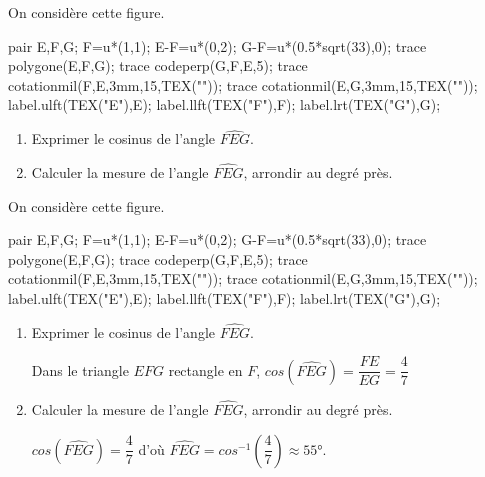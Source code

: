 \begin{exercice*}
    On considère cette figure.
    \begin{center}
        \begin{Geometrie}
            pair E,F,G;
            F=u*(1,1);
            E-F=u*(0,2);
            G-F=u*(0.5*sqrt(33),0);
            trace polygone(E,F,G);
            trace codeperp(G,F,E,5);
            trace cotationmil(F,E,3mm,15,TEX(""));
            trace cotationmil(E,G,3mm,15,TEX(""));
            label.ulft(TEX("E"),E);
            label.llft(TEX("F"),F);
            label.lrt(TEX("G"),G);
        \end{Geometrie}
    \end{center}
    \begin{enumerate}
        \item Exprimer le cosinus de l'angle $\widehat{FEG}$.
        \vspace*{20mm}
        \item Calculer la mesure de l'angle $\widehat{FEG}$, arrondir au degré près.
        \vfill
    \end{enumerate}
\end{exercice*}
\begin{corrige}
    On considère cette figure.
    \begin{center}
        \begin{Geometrie}
            pair E,F,G;
            F=u*(1,1);
            E-F=u*(0,2);
            G-F=u*(0.5*sqrt(33),0);
            trace polygone(E,F,G);
            trace codeperp(G,F,E,5);
            trace cotationmil(F,E,3mm,15,TEX(""));
            trace cotationmil(E,G,3mm,15,TEX(""));
            label.ulft(TEX("E"),E);
            label.llft(TEX("F"),F);
            label.lrt(TEX("G"),G);
        \end{Geometrie}
    \end{center}
    \begin{enumerate}
        \item Exprimer le cosinus de l'angle $\widehat{FEG}$.
        
        {\color{red}Dans le triangle $EFG$ rectangle en $F$, $cos(\widehat{FEG})=\dfrac{FE}{EG}=\dfrac47$}
        \item Calculer la mesure de l'angle $\widehat{FEG}$, arrondir au degré près.
        
        {\color{red}$cos(\widehat{FEG})=\dfrac47$ d'où $\widehat{FEG}=cos^{-1}\left(\dfrac47\right)\approx\ang{55}$.}
    \end{enumerate}
\end{corrige}

